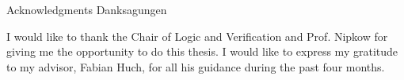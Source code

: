 \makeatletter
{}
{}
{}
\makeatother
\thispagestyle{empty}

\vspace*{20mm}

\begin{center}
\makeatletter
{}
{ Acknowledgments}
{ Danksagungen}
\makeatother
\end{center}

\vspace{10mm}
I would like to thank the Chair of Logic and Verification and Prof. Nipkow for giving me the opportunity to do this thesis. I would like to express my gratitude to my advisor, Fabian Huch, for all his guidance during the past four months. 
\cleardoublepage{}
